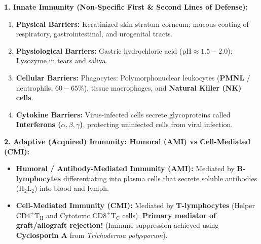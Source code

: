\documentclass[10pt,twoside,openright]{book}
\begin{document}
\begin{conceptbox}
\textbf{1. Innate Immunity (Non-Specific First \& Second Lines of Defense):}
\begin{enumerate}[leftmargin=*]
  \item \textbf{Physical Barriers:} Keratinized skin stratum corneum; mucous coating of respiratory, gastrointestinal, and urogenital tracts.
  \item \textbf{Physiological Barriers:} Gastric hydrochloric acid ($\mathrm{pH} \approx 1.5-2.0$); Lysozyme in tears and saliva.
  \item \textbf{Cellular Barriers:} Phagocytes: Polymorphonuclear leukocytes (\textbf{PMNL} / neutrophils, $60-65\%$), tissue macrophages, and \textbf{Natural Killer (NK) cells}.
  \item \textbf{Cytokine Barriers:} Virus-infected cells secrete glycoproteins called \textbf{Interferons ($\alpha, \beta, \gamma$)}, protecting uninfected cells from viral infection.
\end{enumerate}

\textbf{2. Adaptive (Acquired) Immunity: Humoral (AMI) vs Cell-Mediated (CMI):}
\begin{itemize}
  \item \textbf{Humoral / Antibody-Mediated Immunity (AMI):} Mediated by \textbf{B-lymphocytes} differentiating into plasma cells that secrete soluble antibodies ($\mathrm{H_2L_2}$) into blood and lymph.
  \item \textbf{Cell-Mediated Immunity (CMI):} Mediated by \textbf{T-lymphocytes} (Helper $\mathrm{CD4}^+ \mathrm{T_H}$ and Cytotoxic $\mathrm{CD8}^+ \mathrm{T_C}$ cells). \textbf{Primary mediator of graft/allograft rejection!} (Immune suppression achieved using \textbf{Cyclosporin A} from \textit{Trichoderma polysporum}).
\end{itemize}


\end{conceptbox}
\end{document}
